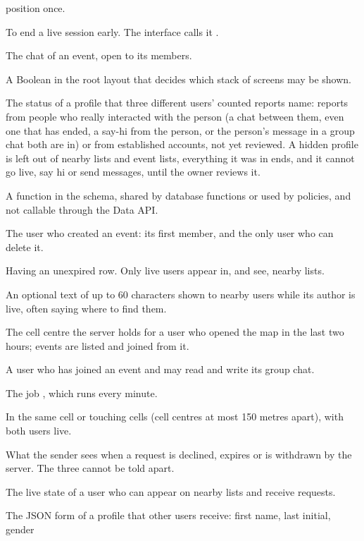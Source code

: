 \begin{description}[itemsep=4pt]
    position once.
  \item[Go offline] To end a live session early. The interface calls it .
  \item[Group chat] The chat of an event, open to its members.
  \item[Guard] A Boolean in the root layout that decides which stack of screens may be shown.
  \item[Hidden] The status of a profile that three different users' counted reports name: reports from
    people who really interacted with the person (a chat between them, even one that has ended, a say-hi
    from the person, or the person's message in a group chat both are in) or from established accounts,
    not yet reviewed. A hidden profile is left out
    of nearby lists and event lists, everything it was in ends, and it cannot go live, say hi or send
    messages, until the owner reviews it.
  \item[Helper] A function in the  schema, shared by database functions or used by policies,
    and not callable through the Data API.
  \item[Host] The user who created an event: its first member, and the only user who can delete it.
  \item[Live] Having an unexpired  row. Only live users appear in, and see, nearby
    lists.
  \item[Live note] An optional text of up to 60 characters shown to nearby users while its author is live,
    often saying where to find them.
  \item[Map position] The cell centre the server holds for a user who opened the map in the last two hours;
    events are listed and joined from it.
  \item[Member] A user who has joined an event and may read and write its group chat.
  \item[Minute job] The  job , which runs 
    every minute.
  \item[Nearby] In the same cell or touching cells (cell centres at most 150 metres apart), with both users
    live.
  \item[Not this time] What the sender sees when a request is declined, expires or is withdrawn by the
    server. The three cannot be told apart.
  \item[Open] The live state of a user who can appear on nearby lists and receive requests.
  \item[Person card] The JSON form of a profile that other users receive: first name, last initial, gender

\end{description}
